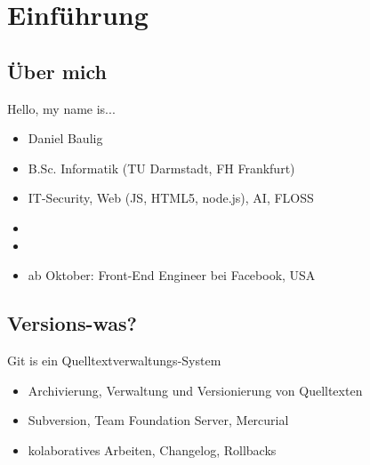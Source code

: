 \newcommand{\command}[1]{\texttt{#1}}
\newcommand{\variable}[1]{\textit{#1}}



\frame{
    \titlepage
}


\section{Einführung}
\subsection{Über mich}

\begin{frame}{Hello, my name is...}
    \begin{itemize}
        \item<1-> Daniel Baulig
        \item<2-> B.Sc. Informatik (TU Darmstadt, FH Frankfurt)
        \item<3-> IT-Security, Web (JS, HTML5, node.js), AI, FLOSS
        \item<4-> 
        \item<5-> 
        \item<7-> ab Oktober: Front-End Engineer bei Facebook, USA
    \end{itemize}

\end{frame}

\subsection{Versions-was?}

\begin{frame}{Git is ein Quelltextverwaltungs-System}
    \begin{itemize}[<+->]
        \item Archivierung, Verwaltung und Versionierung von Quelltexten
        \item Subversion, Team Foundation Server, Mercurial
        \item kolaboratives Arbeiten, Changelog, Rollbacks
    \end{itemize}
\end{frame}

